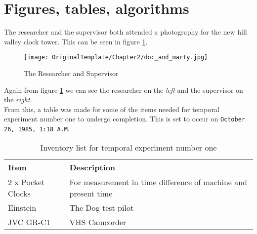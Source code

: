 \section{Figures, tables, algorithms}
\label{sec: figs tables algos}

The researcher and the supervisor both attended a photography for the new hill valley clock tower. This can be seen in figure \ref{fig:clock tower photo}.

\begin{figure}[h!]
    \centering
    \texttt{[image: OriginalTemplate/Chapter2/doc\_and\_marty.jpg]}
    \caption{The Researcher and Supervisor}
    \label{fig:clock tower photo}
\end{figure}

\noindent Again from figure \ref{fig:clock tower photo} we can see the researcher on the \textit{left} and the supervisor on the \textit{right}.\\

From this, a table was made for some of the items needed for temporal experiment number one to undergo completion. This is set to occur on \texttt{October 26, 1985, 1:18 A.M}.

\begin{table}[H] 
\begin{tabularx}{\textwidth}{| X | X |}
    \hline
     Item & Description  \\ \hline
     2 x Pocket Clocks & For measurement in time difference of machine and present time \\ \hline
     Einstein & The Dog test pilot \\ \hline
     JVC GR-C1 & VHS Camcorder \\ \hline
\end{tabularx}
\caption{Inventory list for temporal experiment number one}
\label{table: inventory}
\end{table}
